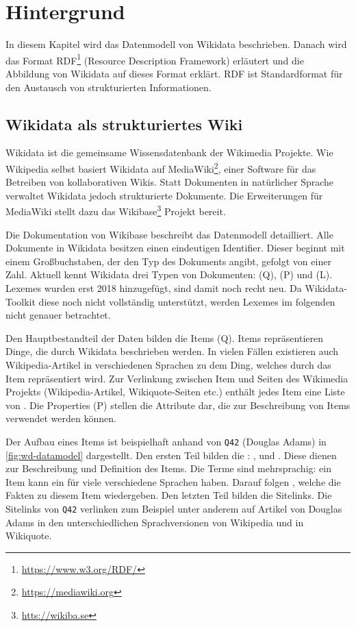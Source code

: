 %
\chapter{Hintergrund}
\label{sec:concepts}
In diesem Kapitel wird das Datenmodell von Wikidata beschrieben.
Danach wird das Format RDF\footnote{\url{https://www.w3.org/RDF/}} (Resource Description Framework) erläutert und die Abbildung von Wikidata auf dieses Format erklärt.
RDF ist Standardformat für den Austausch von strukturierten Informationen. 

\section{Wikidata als strukturiertes Wiki}
Wikidata ist die gemeinsame Wissensdatenbank der Wikimedia Projekte.
Wie Wikipedia selbst basiert Wikidata auf MediaWiki\footnote{\url{https://mediawiki.org}}, einer Software für das Betreiben von kollaborativen Wikis.
Statt Dokumenten in natürlicher Sprache verwaltet Wikidata jedoch strukturierte Dokumente.
Die Erweiterungen für MediaWiki stellt dazu das Wikibase\footnote{\url{htts://wikiba.se}} Projekt bereit.

Die Dokumentation von Wikibase \cite{wikibase-data-model} beschreibt das Datenmodell detailliert.
Alle Dokumente in Wikidata besitzen einen eindeutigen Identifier.
Dieser beginnt mit einem Großbuchstaben, der den Typ des Dokuments angibt, gefolgt von einer Zahl.
Aktuell kennt Wikidata drei Typen von Dokumenten:  (Q),  (P) und  (L).
Lexemes wurden erst 2018 hinzugefügt, sind damit noch recht neu.
Da Wikidata-Toolkit diese noch nicht vollständig unterstützt, werden Lexemes im folgenden nicht genauer betrachtet.

Den Hauptbestandteil der Daten bilden die Items (Q).
Items repräsentieren Dinge, die durch Wikidata beschrieben werden.
In vielen Fällen existieren auch Wikipedia-Artikel in verschiedenen Sprachen zu dem Ding, welches durch das Item repräsentiert wird.
Zur Verlinkung zwischen Item und Seiten des Wikimedia Projekts (Wikipedia-Artikel, Wikiquote-Seiten etc.) enthält jedes Item eine Liste von .
Die Properties (P) stellen die Attribute dar, die zur Beschreibung von Items verwendet werden können.

Der Aufbau eines Items ist beispielhaft anhand von \verb|Q42| (Douglas Adams) in \cref{fig:wd-datamodel} dargestellt.
Den ersten Teil bilden die : ,  und .
Diese dienen zur Beschreibung und Definition des Items.
Die Terme sind mehrsprachig: ein Item kann ein  für viele verschiedene Sprachen haben.
Darauf folgen , welche die Fakten zu diesem Item wiedergeben.
Den letzten Teil bilden die Sitelinks.
Die Sitelinks von \verb|Q42| verlinken zum Beispiel unter anderem auf Artikel von Douglas Adams in den unterschiedlichen Sprachversionen von Wikipedia und in Wikiquote.

